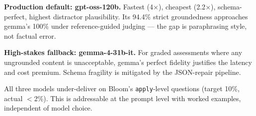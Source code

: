 \textbf{Production default: gpt-oss-120b.} Fastest (4$\times$), cheapest (2.2$\times$), schema-perfect, highest distractor plausibility. Its 94.4\% strict groundedness approaches gemma's 100\% under reference-guided judging --- the gap is paraphrasing style, not factual error.

\textbf{High-stakes fallback: gemma-4-31b-it.} For graded assessments where any ungrounded content is unacceptable, gemma's perfect fidelity justifies the latency and cost premium. Schema fragility is mitigated by the JSON-repair pipeline.

All three models under-deliver on Bloom's \texttt{apply}-level questions (target 10\%, actual $<$2\%). This is addressable at the prompt level with worked examples, independent of model choice.

